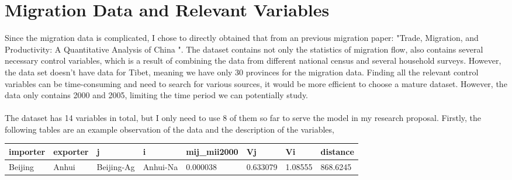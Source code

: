 \documentclass{article}
\begin{document}
\section{Migration Data and Relevant Variables}
Since the migration data is complicated, I chose to directly obtained that from an previous migration paper: "Trade, Migration, and Productivity: A Quantitative Analysis of China "\parencite{Tombe:2019tm}. The dataset contains not only the statistics of migration flow, also contains several necessary control variables, which is a result of combining the data from different national census and several household surveys. However, the data set doesn't have data for Tibet, meaning we have only 30 provinces for the migration data. Finding all the relevant control variables can be time-consuming and need to search for various sources, it would be more efficient to choose a mature dataset. However, the data only contains 2000 and 2005, limiting the time period we can potentially study.
\\~\\
The dataset has 14 variables in total, but I only need to use 8 of them so far to serve the model in my research proposal. Firstly, the following tables are an example observation of the data and the description of the variables,
\begin{table}[H]
\centering
\captionsetup{labelfont=bf}
\label{tab:title}
\begin{tabular}{llllllll}
  \hline
  importer & exporter & j & i & mij\_mii2000 & Vj & Vi & distance \\ 
  \hline
Beijing	& Anhui &	Beijing-Ag	& Anhui-Na & 0.000038 & 0.633079 & 1.08555 & 868.6245


\\
   \hline
\end{tabular}
\end{table}
\end{document}
